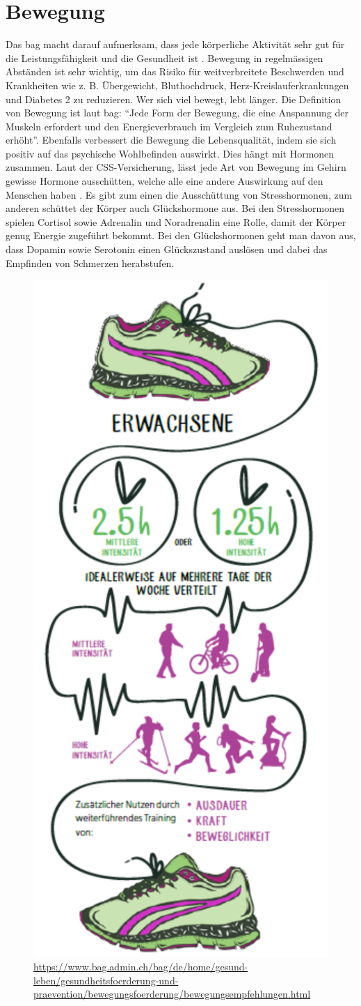 \section{Bewegung}
\authortoc{\bastian}{\sectionident}
Das \acs{bag} macht darauf aufmerksam, dass jede körperliche Aktivität sehr gut für die Leistungsfähigkeit und die Gesundheit ist \cite{bewegungsfoerderung}. Bewegung in regelmässigen Abständen ist sehr wichtig, um das Risiko für weitverbreitete Beschwerden und Krankheiten wie z. B. Übergewicht, Bluthochdruck, Herz-Kreislauferkrankungen und Diabetes 2 zu reduzieren.
\newline
Wer sich viel bewegt, lebt länger. Die Definition von Bewegung ist laut \acs{bag}: “Jede Form der Bewegung, die eine Anspannung der Muskeln erfordert und den Energieverbrauch im Vergleich zum Ruhezustand erhöht”.
\newline
Ebenfalls verbessert die Bewegung die Lebensqualität, indem sie sich positiv auf das psychische Wohlbefinden auswirkt. Dies hängt mit Hormonen zusammen. Laut der CSS-Versicherung, lässt jede Art von Bewegung im Gehirn gewisse Hormone ausschütten, welche alle eine andere Auswirkung auf den Menschen haben \cite{hormone-bei-bewegung}. Es gibt zum einen die Ausschüttung von Stresshormonen, zum anderen schüttet der Körper auch Glückshormone aus. Bei den Stresshormonen spielen Cortisol sowie Adrenalin und Noradrenalin eine Rolle, damit der Körper genug Energie zugeführt bekommt. Bei den Glückshormonen geht man davon aus, dass Dopamin sowie Serotonin einen Glückszustand auslösen und dabei das Empfinden von Schmerzen herabstufen.
\newline
\begin{figure}[H]
  \centering
  \includegraphics[width=0.38\linewidth]{./images/bewegungsempfehlungen-ew-dt.png}
  \caption{Grafik vom BAG zur Bewegungsempfehlung von Erwachsenen Menschen.}
  \label{fig:bewegungsempfehlungen}
  \caption*{\url{https://www.bag.admin.ch/bag/de/home/gesund-leben/gesundheitsfoerderung-und-praevention/bewegungsfoerderung/bewegungsempfehlungen.html}}
\end{figure}
